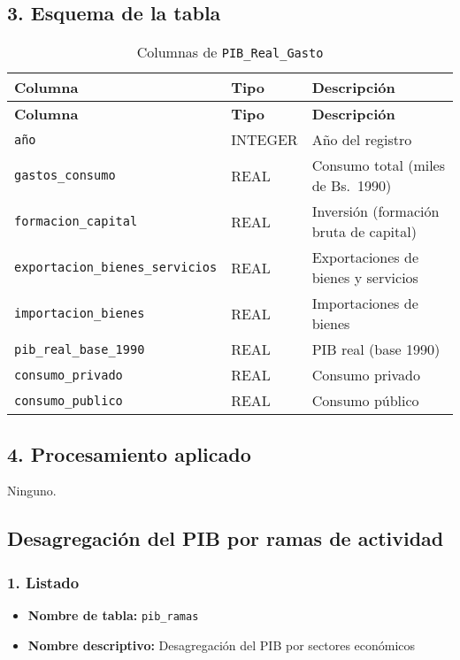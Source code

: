 \documentclass[12pt,a4paper]{article}
\begin{document}
\subsection*{3. Esquema de la tabla}
\begin{longtable}{@{}lll@{}}
\caption{Columnas de \texttt{PIB\_Real\_Gasto}}\\
\toprule
\textbf{Columna} & \textbf{Tipo} & \textbf{Descripción} \\
\midrule
\endfirsthead
\toprule
\textbf{Columna} & \textbf{Tipo} & \textbf{Descripción} \\
\midrule
\endhead
\bottomrule
\endfoot
\texttt{año}                      & INTEGER & Año del registro \\
\texttt{gastos\_consumo}          & REAL    & Consumo total (miles de Bs.\ 1990) \\
\texttt{formacion\_capital}       & REAL    & Inversión (formación bruta de capital) \\
\texttt{exportacion\_bienes\_servicios} & REAL & Exportaciones de bienes y servicios \\
\texttt{importacion\_bienes}      & REAL    & Importaciones de bienes \\
\texttt{pib\_real\_base\_1990}    & REAL    & PIB real (base 1990) \\
\texttt{consumo\_privado}         & REAL    & Consumo privado \\
\texttt{consumo\_publico}         & REAL    & Consumo público \\
\end{longtable}

\subsection*{4. Procesamiento aplicado}
Ninguno.


\newpage
\subsection{Desagregación del PIB por ramas de actividad }

\subsubsection*{1. Listado}
\begin{itemize}
  \item \textbf{Nombre de tabla:} \texttt{pib\_ramas}
  \item \textbf{Nombre descriptivo:} Desagregación del PIB por sectores económicos
\end{itemize}
\end{document}
